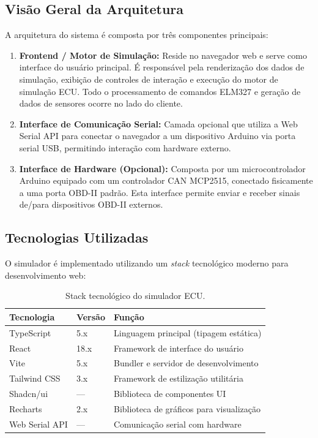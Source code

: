 \subsection{Visão Geral da Arquitetura}

A arquitetura do sistema é composta por três componentes principais:

\begin{enumerate}
    \item \textbf{Frontend / Motor de Simulação:} Reside no navegador web e serve como interface do usuário principal. É responsável pela renderização dos dados de simulação, exibição de controles de interação e execução do motor de simulação ECU. Todo o processamento de comandos ELM327 e geração de dados de sensores ocorre no lado do cliente.
    
    \item \textbf{Interface de Comunicação Serial:} Camada opcional que utiliza a Web Serial API para conectar o navegador a um dispositivo Arduino via porta serial USB, permitindo interação com hardware externo.
    
    \item \textbf{Interface de Hardware (Opcional):} Composta por um microcontrolador Arduino equipado com um controlador CAN MCP2515, conectado fisicamente a uma porta OBD-II padrão. Esta interface permite enviar e receber sinais de/para dispositivos OBD-II externos.
\end{enumerate}

\subsection{Tecnologias Utilizadas}

O simulador é implementado utilizando um \textit{stack} tecnológico moderno para desenvolvimento web:

\begin{table}[H]
\centering
\caption{Stack tecnológico do simulador ECU.}
\label{tab:tecnologias}
\begin{tabular}{@{}lll@{}}
\toprule
\textbf{Tecnologia} & \textbf{Versão} & \textbf{Função} \\
\midrule
TypeScript & 5.x & Linguagem principal (tipagem estática) \\
React & 18.x & Framework de interface do usuário \\
Vite & 5.x & Bundler e servidor de desenvolvimento \\
Tailwind CSS & 3.x & Framework de estilização utilitária \\
Shadcn/ui & --- & Biblioteca de componentes UI \\
Recharts & 2.x & Biblioteca de gráficos para visualização \\
Web Serial API & --- & Comunicação serial com hardware \\
\bottomrule
\end{tabular}
\end{table}

